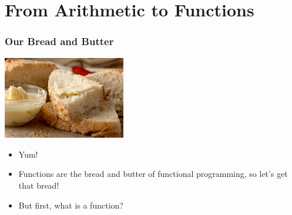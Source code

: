 \documentclass{beamer}
\begin{document}


\section{From Arithmetic to Functions}
\begin{frame}
  \frametitle{Our Bread and Butter}
  \begin{center}
    \includegraphics[width=0.4\textwidth]{images/bread-butter.jpg}
  \end{center}
  \begin{itemize}
  \item<2-> Yum!
  \item<3-> Functions are the bread and butter of functional programming, so let's get that bread!
  \item<4-> \huge But first, what is a function?
  \end{itemize}
\end{frame}
\end{document}
